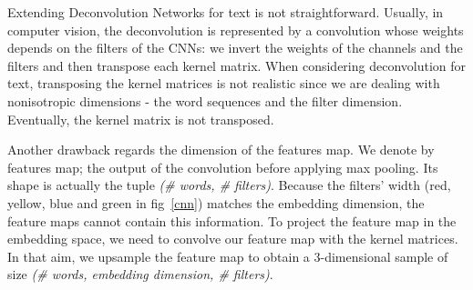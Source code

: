 % 
% 
Extending Deconvolution Networks for text is not straightforward. Usually, in computer vision, 
the deconvolution is represented by a convolution whose weights depends on the filters of the CNNs:  we invert the weights of the channels and the filters and then transpose each kernel matrix. When considering deconvolution for text, transposing the kernel matrices is not realistic since we are dealing with nonisotropic dimensions - the word sequences and the filter dimension. Eventually, the kernel matrix is not transposed.

Another drawback regards the dimension of the features map. We denote by features map; the output of the convolution before applying max pooling.
Its shape is actually the tuple \textit{(\# words, \# filters)}. Because the filters’ width (red, yellow, blue and green in fig~\ref{cnn}) matches the embedding dimension, 
the feature maps cannot contain this information. To project the feature map in the embedding space,  we need to convolve our feature map with the kernel matrices.
In that aim, we upsample the feature map to obtain a 3-dimensional sample of size \textit{(\# words, embedding dimension, \# filters)}.

